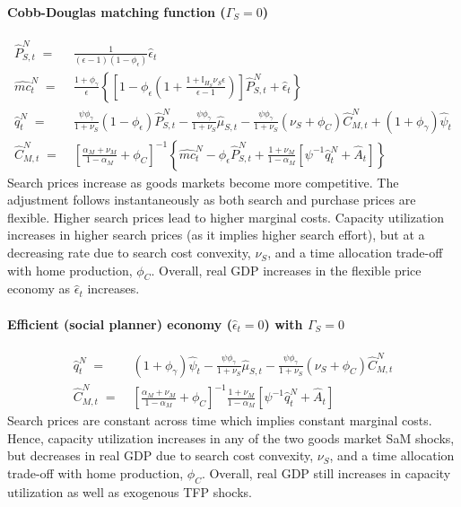 \documentclass[12pt,3p,authoryear,review]{elsarticle}
\begin{document}
\begin{small}
    \paragraph{Cobb-Douglas matching function ($\Gamma_S = 0$)}%
    \begin{align}%
        \hat{P}_{S,t}^N \; = & \; \frac{1}{\left(\epsilon-1\right)\left(1-\phi_\epsilon\right)} \hat{\epsilon}_t\\%
        \hat{mc}_t^N \; = & \; \frac{1+\phi_\gamma}{\epsilon} \left\{ \left[ 1-\phi_\epsilon \left(1+\frac{1+\mathbb{I}_{H_S}\nu_S\epsilon}{\epsilon-1}\right) \right] \hat{P}_{S,t}^N + \hat{\epsilon}_t \right\}\\%
        \hat{q}_t^N \; = & \; \frac{\psi\phi_\gamma}{1+\nu_S} \left(1-\phi_\epsilon\right)\hat{P}_{S,t}^N  -\frac{\psi\phi_\gamma}{1+\nu_S} \hat{\mu}_{S,t} - \frac{\psi\phi_\gamma}{1+\nu_S} \left(\nu_S+\phi_C\right) \hat{C}_{M,t}^N + \left(1+\phi_\gamma\right)\hat{\psi}_t\\%
        \hat{C}_{M,t}^N \; = & \; \left[\frac{\alpha_M+\nu_M}{1-\alpha_M}+\phi_C\right]^{-1} \left\{ \hat{mc}_t^N - \phi_\epsilon \hat{P}_{S,t}^N + \frac{1+\nu_M}{1-\alpha_M} \left[ \psi^{-1}\hat{q}_t^N + \hat{A}_t\right] \right\}%
    \end{align}%
    Search prices increase as goods markets become more competitive. The adjustment follows instantaneously as both search and purchase prices are flexible. Higher search prices lead to higher marginal costs. Capacity utilization increases in higher search prices (as it implies higher search effort), but at a decreasing rate due to search cost convexity, $\nu_S$, and a time allocation trade-off with home production, $\phi_C$. Overall, real GDP increases in the flexible price economy as $\hat{\epsilon}_t$ increases.%
    \paragraph{Efficient (social planner) economy ($\hat{\epsilon}_t = 0$) with $\Gamma_S = 0$}%
    \begin{align}%
        \hat{q}_t^N \; = & \; \left(1+\phi_\gamma\right)\hat{\psi}_t - \frac{\psi\phi_\gamma}{1+\nu_S} \hat{\mu}_{S,t} - \frac{\psi\phi_\gamma}{1+\nu_S} \left(\nu_S+\phi_C\right) \hat{C}_{M,t}^N\\%
        \hat{C}_{M,t}^N \; = & \; \left[\frac{\alpha_M+\nu_M}{1-\alpha_M}+\phi_C\right]^{-1} \frac{1+\nu_M}{1-\alpha_M} \left[ \psi^{-1}\hat{q}_t^N + \hat{A}_t\right]%
    \end{align}%
    Search prices are constant across time which implies constant marginal costs. Hence, capacity utilization increases in any of the two goods market SaM shocks, but decreases in real GDP due to search cost convexity, $\nu_S$, and a time allocation trade-off with home production, $\phi_C$. Overall, real GDP still increases in capacity utilization as well as exogenous TFP shocks.%
\end{small}%
\end{document}
